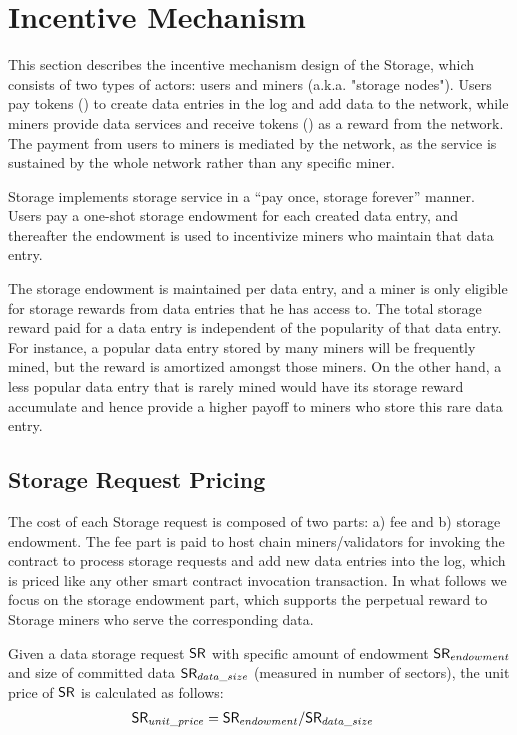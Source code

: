 
\section{Incentive Mechanism}

This section describes the incentive mechanism design of the \projabbrev Storage, which consists of two types of actors: users and miners (a.k.a. "storage nodes").
Users pay tokens (\token) to create data entries in the log and add data to the network, while miners provide data services and receive tokens (\token) as a reward from the network.
The payment from users to miners is mediated by the \project network,
as the service is sustained by the whole network rather than any specific miner.

\projabbrev Storage implements storage service in a ``pay once, storage forever'' manner.
Users pay a one-shot storage endowment for each created data entry, and thereafter the endowment is used to incentivize miners who maintain that data entry.


The storage endowment is maintained per data entry,
and a miner is only eligible for storage rewards from data entries that he has access to.
The total storage reward paid for a data entry is independent of the popularity of that data entry.
For instance, a popular data entry stored by many miners will be frequently mined, but the reward is amortized amongst those miners.
On the other hand, a less popular data entry that is rarely mined would have its storage reward accumulate and hence provide a higher payoff to miners who store this rare data entry.



\subsection{Storage Request Pricing}

The cost of each \projabbrev Storage request is composed of two parts: a) fee and b) storage endowment.
The fee part is paid to host chain miners/validators for invoking the \project contract to process storage requests and add new data entries into the log, which is priced like any other smart contract invocation transaction.
In what follows we focus on the storage endowment part, 
which supports the perpetual reward to \projabbrev Storage miners who serve the corresponding data.

Given a data storage request $\mathsf{SR}$ with specific amount of endowment $\mathsf{SR}_{endowment}$ and size of committed data $\mathsf{SR}_{data\_size}$ (measured in number of \sectorsize sectors),
the unit price of $\mathsf{SR}$ is calculated as follows:
\begin{align}
	\mathsf{SR}_{unit\_price} &= \mathsf{SR}_{endowment}/\mathsf{SR}_{data\_size}
\end{align}

